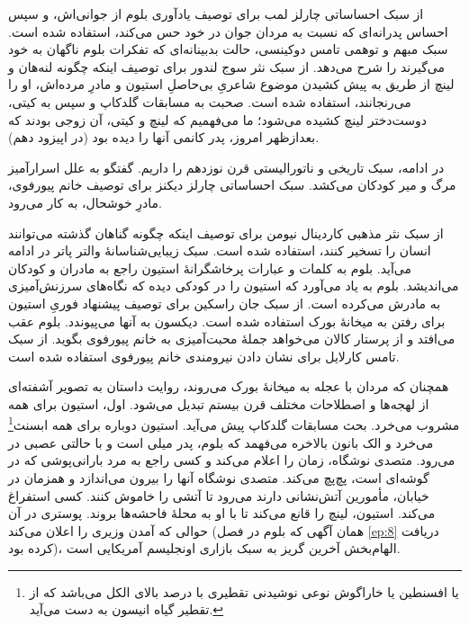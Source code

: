 \documentclass[12pt]{book}
\begin{document}
    از سبک احساساتی چارلز لمب برای توصیف یادآوری بلوم از جوانی‌اش، و سپس احساس پدرانه‌ای که نسبت به مردان جوان در خود حس می‌کند، استفاده شده است. سبک مبهم و توهمی تامس دوکینسی، حالت بدبینانه‌ای که تفکرات بلوم ناگهان به خود می‌گیرند را شرح می‌دهد. از سبک نثر سوج لندور برای توصیف اینکه چگونه لنه‌هان و لینچ از طریق به پیش کشیدن موضوع شاعریِ بی‌حاصلِ استیون و مادرِ مرده‌اش، او را می‌رنجانند، استفاده شده است. صحبت به مسابقات گلدکاپ و سپس به کیتی، دوست‌دختر لینچ کشیده می‌شود؛ ما می‌فهمیم که لینچ و کیتی، آن زوجی بودند که بعدازظهر امروز، پدر کانمی آنها را دیده بود (در اپیزود دهم).

    در ادامه، سبک تاریخی و ناتورالیستی قرن نوزدهم را داریم. گفتگو به علل اسرارآمیز مرگ و میر کودکان می‌کشد. سبک احساساتی چارلز دیکنز برای توصیف خانم پیورفوی، مادرِ خوشحال، به کار می‌رود.

    از سبک نثر مذهبی کاردینال نیومن برای توصیف اینکه چگونه گناهان گذشته می‌توانند انسان را تسخیر کنند، استفاده شده است. سبک زیبایی‌شناسانۀ والتر پاتر در ادامه می‌آید. بلوم به کلمات و عبارات پرخاشگرانۀ استیون راجع به مادران و کودکان می‌اندیشد. بلوم به یاد می‌آورد که استیون را در کودکی دیده که نگاه‌های سرزنش‌آمیزی به مادرش می‌کرده است. از سبک جان راسکین برای توصیف پیشنهاد فوریِ استیون برای رفتن به میخانۀ بورک استفاده شده است. دیکسون به آنها می‌پیوندد. بلوم عقب می‌افتد و از پرستار کالان می‌خواهد جملۀ محبت‌آمیزی به خانم پیورفوی بگوید. از سبک تامس کارلایل برای نشان دادن نیرومندی خانم پیورفوی استفاده شده است.

    همچنان که مردان با عجله به میخانۀ بورک می‌روند، روایت داستان به تصویر آشفته‌ای از لهجه‌ها و اصطلاحات مختلف قرن بیستم تبدیل می‌شود. اول، استیون برای همه مشروب می‌خرد. بحث مسابقات گلدکاپ پیش می‌آید. استیون دوباره برای همه ابسنث\footnote{یا افسنطین یا خاراگوش نوعی نوشیدنی تقطیری با درصد بالای الکل می‌باشد که از تقطیر گیاه انیسون به دست می‌آید.} می‌خرد و الک بانون بالاخره می‌فهمد که بلوم، پدر میلی است و با حالتی عصبی در می‌رود. متصدی نوشگاه، زمان را اعلام می‌کند و کسی راجع به مرد بارانی‌پوشی که در گوشه‌ای است، پچ‌پچ می‌کند. متصدی نوشگاه آنها را بیرون می‌اندازد و همزمان در خیابان، مأمورین آتش‌نشانی دارند می‌رود تا آتشی را خاموش کنند. کسی استفراغ می‌کند. استیون، لینچ را قانع می‌کند تا با او به محلۀ فاحشه‌ها بروند. پوستری در آن حوالی که آمدن وزیری را اعلان می‌کند (همان آگهی که بلوم در فصل \ref{ep:8} دریافت کرده بود)، الهام‌بخش آخرین گریز به سبک بازاری اونجلیسم آمریکایی است.
\end{document}
